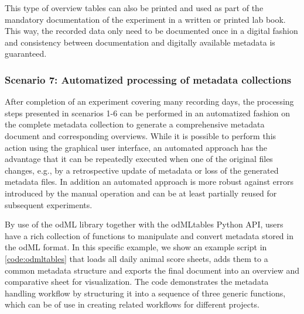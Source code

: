 This type of overview tables can also be printed and used as part of the mandatory documentation of the experiment in a written or printed lab book. This way, the recorded data only need to be documented once in a digital fashion and consistency between documentation and digitally available metadata is guaranteed. 

\subsubsection*{Scenario 7: Automatized processing of metadata collections}
After completion of an experiment covering many recording days, the processing steps presented in scenarios 1-6 can be performed in an automatized fashion on the complete metadata collection to generate a comprehensive metadata document and corresponding overviews. While it is possible to perform this action using the graphical user interface, an automated approach has the advantage that it can be repeatedly executed when one of the original files changes, e.g., by a retrospective update of metadata or loss of the generated metadata files. In addition an automated approach is more robust against errors introduced by the manual operation and can be at least partially reused for subsequent experiments.

By use of the odML library together with the odMLtables Python API, users have a rich collection of functions to manipulate and convert metadata stored in the odML format. In this specific example, we show an example script in \cref{code:odmltables} that loads all daily animal score sheets, adds them to a common metadata structure and exports the final document into an overview and comparative  sheet for visualization. The code demonstrates the metadata handling workflow by structuring it into a sequence of three generic functions, which can be of use in creating related workflows for different projects.





